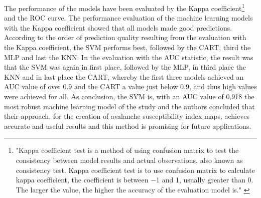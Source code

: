 \documentclass[../masterarbeit.tex]{subfiles}
\begin{document}
The performance of the models have been evaluated by the Kappa coefficient\footnote{"Kappa coefficient test is a method of using confusion matrix to test the consistency between model results and actual observations, also known as consistency test. Kappa coefficient test is to use confusion matrix to calculate kappa coefficient, the coefficient is between −1 and 1, usually greater than 0. The larger the value, the higher the accuracy of the evaluation model is." \autocite[]{WEN2022103535} } and the ROC curve. 
The performance evaluation of the machine learning models with the Kappa coefficient showed that all models made good predictions. According to the order of prediction quality resulting from the evaluation with the Kappa coefficient, the SVM performs best, followed by the CART, third the MLP and last the KNN. In the evaluation with the AUC statistic, the result was that the SVM was again in first place, followed by the MLP, in third place the KNN and in last place the CART, whereby the first three models achieved an AUC value of over 0.9 and the CART a value just below 0.9, and thus high values were achieved for all.
As conclusion, the SVM is, with an AUC value of 0.918 the most robust machine learning model of the study and the authors concluded that their approach, for the creation of avalanche susceptibility index maps, achieves accurate and useful results and this method is promising for future applications. \autocite[]{WEN2022103535} \\
\end{document}

